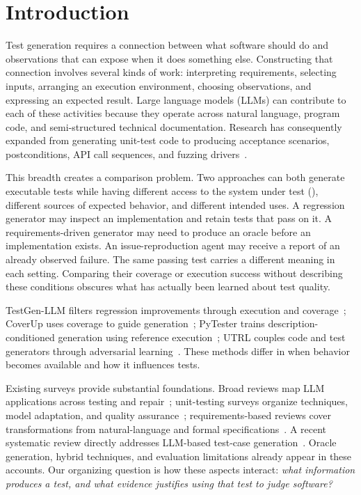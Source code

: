 \section{Introduction}
Test generation requires a connection between what software should do and observations that can expose when it does something else. Constructing that connection involves several kinds of work: interpreting requirements, selecting inputs, arranging an execution environment, choosing observations, and expressing an expected result. Large language models (LLMs) can contribute to each of these activities because they operate across natural language, program code, and semi-structured technical documentation. Research has consequently expanded from generating unit-test code to producing acceptance scenarios, postconditions, API call sequences, and fuzzing drivers~\cite{S01,S02,S05}.

This breadth creates a comparison problem. Two approaches can both generate executable tests while having different access to the system under test (\sut), different sources of expected behavior, and different intended uses. A regression generator may inspect an implementation and retain tests that pass on it. A requirements-driven generator may need to produce an oracle before an implementation exists. An issue-reproduction agent may receive a report of an already observed failure. The same passing test carries a different meaning in each setting. Comparing their coverage or execution success without describing these conditions obscures what has actually been learned about test quality.

TestGen-LLM filters regression improvements through execution and coverage~\cite{U07}; CoverUp uses coverage to guide generation~\cite{U05}; PyTester trains description-conditioned generation using reference execution~\cite{T01}; UTRL couples code and test generators through adversarial learning~\cite{T02}. These methods differ in when behavior becomes available and how it influences tests.

Existing surveys provide substantial foundations. Broad reviews map LLM applications across testing and repair~\cite{S01,S04}; unit-testing surveys organize techniques, model adaptation, and quality assurance~\cite{S02,S03}; requirements-based reviews cover transformations from natural-language and formal specifications~\cite{S05,S06}. A recent systematic review directly addresses LLM-based test-case generation~\cite{S07}. Oracle generation, hybrid techniques, and evaluation limitations already appear in these accounts. Our organizing question is how these aspects interact: \emph{what information produces a test, and what evidence justifies using that test to judge software?}


